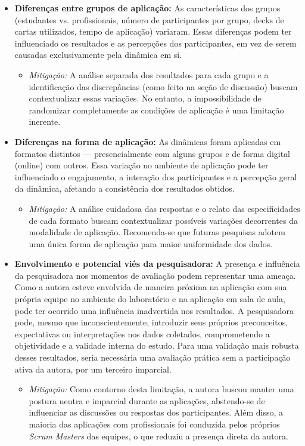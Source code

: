 \documentclass[
	12pt,
	openright,
	twoside,
	a4paper,
	english,
	brazil
	]{abntex2}
\begin{document}
\begin{itemize}
  \item \textbf{Diferenças entre grupos de aplicação:} As características dos grupos (estudantes vs. profissionais, número de participantes por grupo, decks de cartas utilizados, tempo de aplicação) variaram. Essas diferenças podem ter influenciado os resultados e as percepções dos participantes, em vez de serem causadas exclusivamente pela dinâmica em si.
  \begin{itemize}
    \item \textit{Mitigação:} A análise separada dos resultados para cada grupo e a identificação das discrepâncias (como feito na seção de discussão) buscam contextualizar essas variações. No entanto, a impossibilidade de randomizar completamente as condições de aplicação é uma limitação inerente.
    \end{itemize}
  \item \textbf{Diferenças na forma de aplicação:} As dinâmicas foram aplicadas em formatos distintos — presencialmente com alguns grupos e de forma digital (online) com outros. Essa variação no ambiente de aplicação pode ter influenciado o engajamento, a interação dos participantes e a percepção geral da dinâmica, afetando a consistência dos resultados obtidos.
  \begin{itemize}
    \item \textit{Mitigação:} A análise cuidadosa das respostas e o relato das especificidades de cada formato buscam contextualizar possíveis variações decorrentes da modalidade de aplicação. Recomenda-se que futuras pesquisas adotem uma única forma de aplicação para maior uniformidade dos dados.
  \end{itemize}
  \item \textbf{Envolvimento e potencial viés da pesquisadora:} A presença e influência da pesquisadora nos momentos de avaliação podem representar uma ameaça. Como a autora esteve envolvida de maneira próxima na aplicação com sua própria equipe no ambiente do laboratório e na aplicação em sala de aula, pode ter ocorrido uma influência inadvertida nos resultados. A pesquisadora pode, mesmo que inconscientemente, introduzir seus próprios preconceitos, expectativas ou interpretações nos dados coletados, comprometendo a objetividade e a validade interna do estudo. Para uma validação mais robusta desses resultados, seria necessária uma avaliação prática sem a participação ativa da autora, por um terceiro imparcial.
  \begin{itemize}
    \item \textit{Mitigação:} Como contorno desta limitação, a autora buscou manter uma postura neutra e imparcial durante as aplicações, abstendo-se de influenciar as discussões ou respostas dos participantes. Além disso, a maioria das aplicações com profissionais foi conduzida pelos próprios \textit{Scrum Masters} das equipes, o que reduziu a presença direta da autora.

\end{itemize}
\end{itemize}
\end{document}
